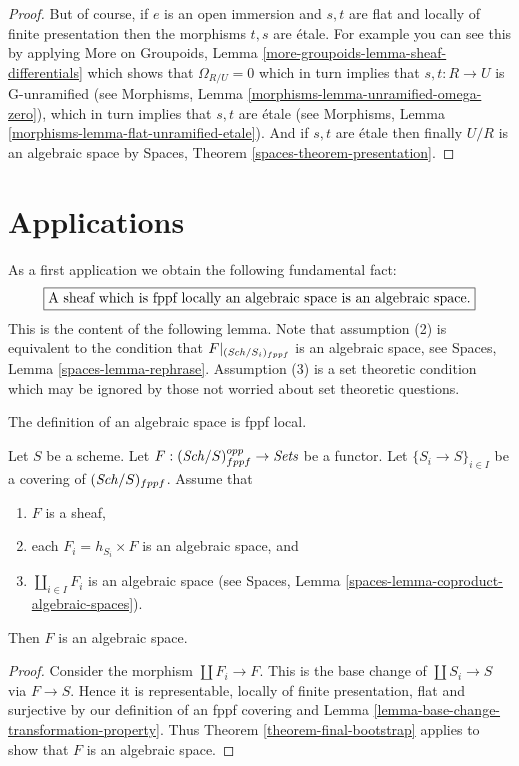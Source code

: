 \begin{proof}
\medskip\noindent
But of course, if $e$ is an open immersion and
$s, t$ are flat and locally of finite presentation
then the morphisms $t, s$ are \'etale.
For example you can see this by applying
More on Groupoids, Lemma \ref{more-groupoids-lemma-sheaf-differentials}
which shows that $\Omega_{R/U} = 0$ which in turn implies
that $s, t : R \to U$ is G-unramified (see
Morphisms, Lemma \ref{morphisms-lemma-unramified-omega-zero}),
which in turn implies that $s, t$ are \'etale (see
Morphisms, Lemma \ref{morphisms-lemma-flat-unramified-etale}).
And if $s, t$ are \'etale then finally $U/R$ is an algebraic
space by
Spaces, Theorem \ref{spaces-theorem-presentation}.
\end{proof}





\section{Applications}
\label{section-applications}

\noindent
As a first application we obtain the following fundamental fact:
$$
\fbox{A sheaf which is fppf locally an algebraic space is an algebraic space.}
$$
This is the content of the following lemma.
Note that assumption (2) is equivalent to the condition that
$F|_{(\mathit{Sch}/S_i)_{fppf}}$ is an algebraic space, see
Spaces, Lemma \ref{spaces-lemma-rephrase}.
Assumption (3) is a set theoretic condition which may be ignored
by those not worried about set theoretic questions.

\begin{lemma}
\label{lemma-locally-algebraic-space}
\begin{slogan}
The definition of an algebraic space is fppf local.
\end{slogan}
Let $S$ be a scheme.
Let $F : (\mathit{Sch}/S)_{fppf}^{opp} \to \textit{Sets}$ be a functor.
Let $\{S_i \to S\}_{i \in I}$ be a covering of $(\mathit{Sch}/S)_{fppf}$.
Assume that
\begin{enumerate}
\item $F$ is a sheaf,
\item each $F_i = h_{S_i} \times F$ is an algebraic space, and
\item $\coprod_{i \in I} F_i$ is an algebraic space (see
Spaces, Lemma \ref{spaces-lemma-coproduct-algebraic-spaces}).
\end{enumerate}
Then $F$ is an algebraic space.
\end{lemma}

\begin{proof}
Consider the morphism $\coprod F_i \to F$. This is the base change
of $\coprod S_i \to S$ via $F \to S$. Hence it is representable,
locally of finite presentation, flat and surjective by our definition
of an fppf covering and
Lemma \ref{lemma-base-change-transformation-property}.
Thus
Theorem \ref{theorem-final-bootstrap}
applies to show that $F$ is an algebraic space.
\end{proof}

